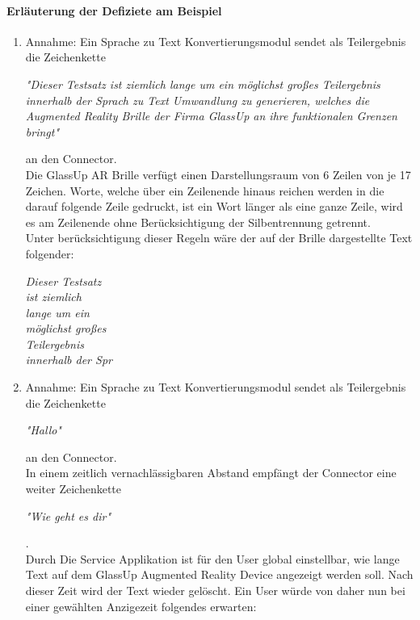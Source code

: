 \paragraph{Erläuterung der Defiziete am Beispiel}
\begin{enumerate} 
	\item
Annahme: Ein Sprache zu Text Konvertierungsmodul sendet als Teilergebnis die Zeichenkette
\begin{addmargin}[1cm]{0cm}
	\textit{"Dieser Testsatz ist ziemlich lange um ein möglichst großes Teilergebnis innerhalb der Sprach zu Text Umwandlung zu generieren, welches die Augmented Reality Brille der Firma GlassUp an ihre funktionalen Grenzen bringt"}
\end{addmargin}
an den Connector. \\
Die GlassUp AR Brille verfügt einen Darstellungsraum von 6 Zeilen von je 17 Zeichen. Worte, welche über ein Zeilenende hinaus reichen werden in die darauf folgende Zeile gedruckt, ist ein Wort länger als eine ganze Zeile, wird es am Zeilenende ohne Berücksichtigung der Silbentrennung getrennt.\\
Unter berücksichtigung dieser Regeln wäre der auf der Brille dargestellte Text folgender:
\begin{addmargin}[1cm]{0cm}
		\textit{Dieser Testsatz\\
	ist ziemlich \\
	lange um ein \\
	möglichst großes\\
	Teilergebnis \\
	innerhalb der Spr
}
\end{addmargin}
\item
Annahme: Ein Sprache zu Text Konvertierungsmodul sendet als Teilergebnis die Zeichenkette 
\begin{addmargin}[1cm]{0cm}
	\textit{"Hallo"}
\end{addmargin}
an den Connector.\\
In einem zeitlich vernachlässigbaren Abstand empfängt der Connector eine weiter Zeichenkette
\begin{addmargin}[1cm]{0cm}
	\textit{"Wie geht es dir"}
\end{addmargin}
.\\
Durch Die Service Applikation ist für den User global einstellbar, wie lange Text auf dem GlassUp Augmented Reality Device angezeigt werden soll. Nach dieser Zeit wird der Text wieder gelöscht. Ein User würde von daher nun bei einer gewählten Anzigezeit folgendes erwarten: \\

\end{enumerate}
